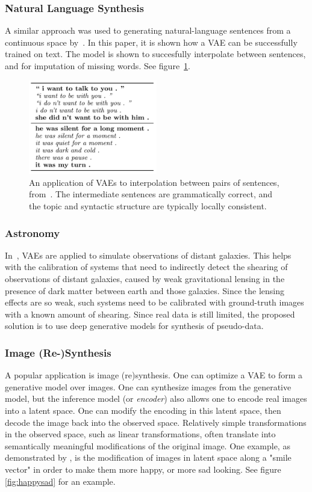 \documentclass[MAL,biber]{nowfnt} %
\begin{document}
\subsubsection{Natural Language Synthesis}
A similar approach was used to generating natural-language sentences from a continuous space by~\cite{bowman2015generating}. In this paper, it is shown how a VAE can be successfully trained on text. The model is shown to succesfully interpolate between sentences, and for imputation of missing words. See figure~\ref{fig:sentences}.

\begin{figure}
	\centering
	\includegraphics[width=0.5\textwidth]{figures/sentences.png}
	\caption{An application of VAEs to interpolation between pairs of sentences, from~\citep{bowman2015generating}. The intermediate sentences are grammatically correct, and the topic and syntactic structure are typically locally consistent.}
	\label{fig:sentences}
\end{figure}

\subsubsection{Astronomy}
In~\citep{ravanbakhsh2016enabling}, VAEs are applied to simulate observations of distant galaxies. This helps with the calibration of systems that need to indirectly detect the shearing of observations of distant galaxies, caused by weak gravitational lensing in the presence of dark matter between earth and those galaxies. Since the lensing effects are so weak, such systems need to be calibrated with ground-truth images with a known amount of shearing. Since real data is still limited, the proposed solution is to use deep generative models for synthesis of pseudo-data.

\subsubsection{Image (Re-)Synthesis}
A popular application is image (re)synthesis. One can optimize a VAE to form a generative model over images. One can synthesize images from the generative model, but the inference model (or \emph{encoder}) also allows one to encode real images into a latent space. One can modify the encoding in this latent space, then decode the image back into the observed space. 
Relatively simple transformations in the observed space, such as linear transformations, often translate into semantically meaningful modifications of the original image. 
One example, as demonstrated by \cite{white2016sampling}, is the modification of images in latent space along a "smile vector" in order to make them more happy, or more sad looking. See figure \ref{fig:happysad} for an example. 
\end{document}
